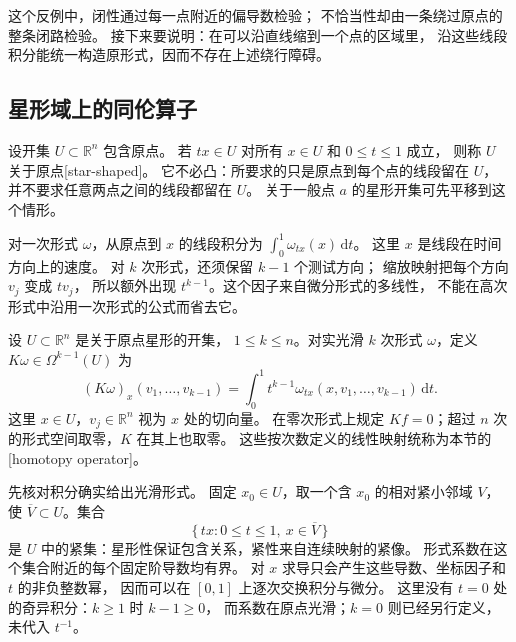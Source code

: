 \ProseParagraphBreak

这个反例中，闭性通过每一点附近的偏导数检验；
不恰当性却由一条绕过原点的整条闭路检验。
接下来要说明：在可以沿直线缩到一个点的区域里，
沿这些线段积分能统一构造原形式，因而不存在上述绕行障碍。

\subsection{星形域上的同伦算子}
\label{b1:subsec:E10502}

设开集 \(U\subset\mathbb R^n\) 包含原点。
若 \(tx\in U\) 对所有 \(x\in U\) 和 \(0\leq t\leq1\) 成立，
则称 \(U\) 关于原点[star-shaped]。
它不必凸：所要求的只是原点到每个点的线段留在 \(U\)，
并不要求任意两点之间的线段都留在 \(U\)。
关于一般点 \(a\) 的星形开集可先平移到这个情形。

\ProseParagraphBreak

对一次形式 \(\omega\)，从原点到 \(x\) 的线段积分为
\(\int_0^1\omega_{tx}(x)\,\mathrm dt\)。
这里 \(x\) 是线段在时间方向上的速度。
对 \(k\) 次形式，还须保留 \(k-1\) 个测试方向；
缩放映射把每个方向 \(v_j\) 变成 \(tv_j\)，
所以额外出现 \(t^{k-1}\)。这个因子来自微分形式的多线性，
不能在高次形式中沿用一次形式的公式而省去它。

\begin{definition}\label{b1:def:E-homotopy-operator}
设 \(U\subset\mathbb R^n\) 是关于原点星形的开集，
\(1\leq k\leq n\)。对实光滑 \(k\) 次形式 \(\omega\)，定义
\(K\omega\in\Omega^{k-1}(U)\) 为
\begin{equation}\label{b1:eq:E-radial-K}
 (K\omega)_x(v_1,\ldots,v_{k-1})
 =\int_0^1t^{k-1}\omega_{tx}(x,v_1,\ldots,v_{k-1})\,\mathrm dt.
\end{equation}
这里 \(x\in U\)，\(v_j\in\mathbb R^n\) 视为 \(x\) 处的切向量。
在零次形式上规定 \(Kf=0\)；超过 \(n\) 次的形式空间取零，\(K\) 在其上也取零。
这些按次数定义的线性映射统称为本节的
[homotopy operator]。
\end{definition}

先核对积分确实给出光滑形式。
固定 \(x_0\in U\)，取一个含 \(x_0\) 的相对紧小邻域 \(V\)，使
\(\overline V\subset U\)。集合
\[
 \{\,tx:0\leq t\leq1,\ x\in\overline V\,\}
\]
是 \(U\) 中的紧集：星形性保证包含关系，紧性来自连续映射的紧像。
形式系数在这个集合附近的每个固定阶导数均有界。
对 \(x\) 求导只会产生这些导数、坐标因子和 \(t\) 的非负整数幂，
因而可以在 \([0,1]\) 上逐次交换积分与微分。
这里没有 \(t=0\) 处的奇异积分：\(k\geq1\) 时 \(k-1\geq0\)，
而系数在原点光滑；\(k=0\) 则已经另行定义，未代入 \(t^{-1}\)。

